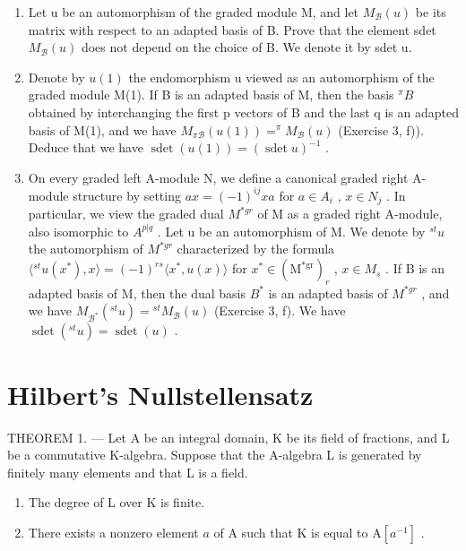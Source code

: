 \begin{enumerate}
\def\labelenumi{\alph{enumi})}
\item
  Let u be an automorphism of the graded module M, and let \(M_{\mathcal{B}}(u)\) be its matrix with respect to an adapted basis of B. Prove that the element sdet \(M_{\mathcal{B}}(u)\) does not depend on the choice of B. We denote it by sdet u.
\item
  Denote by \(u(1)\) the endomorphism u viewed as an automorphism of the graded module M(1). If B is an adapted basis of M, then the basis \(^{\pi}B\) obtained by interchanging the first p vectors of B and the last q is an adapted basis of M(1), and we have \(M_{\pi\mathcal{B}}(u(1)) = ^{\pi}M_{\mathcal{B}}(u)\) (Exercise 3, f)). Deduce that we have \(\operatorname{sdet}(u(1)) = (\operatorname{sdet} u)^{-1}\) .
\item
  On every graded left A-module N, we define a canonical graded right A-module structure by setting \(ax = (-1)^{ij}xa\) for \(a \in A_i\) , \(x \in N_j\) . In particular, we view the graded dual \(M^{*gr}\) of M as a graded right A-module, also isomorphic to \(A^{p|q}\) . Let u be an automorphism of M. We denote by \({}^{st}u\) the automorphism of \(M^{*gr}\) characterized by the formula \(\langle{}^{st}u(x^{*}), x\rangle = (-1)^{rs}\langle x^{*}, u(x)\rangle\) for \(x^{*} \in (\mathrm{M}^{*\mathrm{gr}})_r\) , \(x \in M_s\) . If B is an adapted basis of M, then the dual basis \(B^*\) is an adapted basis of \(M^{*gr}\) , and we have \(M_{\mathcal{B}^*}({}^{st}u) = {}^{st}M_{\mathcal{B}}(u)\) (Exercise 3, f). We have \(\operatorname{sdet}({}^{st}u) = \operatorname{sdet}(u)\) .
\end{enumerate}

\chapter{Hilbert's Nullstellensatz}

THEOREM 1. --- Let A be an integral domain, K be its field of fractions, and L be a commutative K-algebra. Suppose that the A-algebra L is generated by finitely many elements and that L is a field.

\begin{enumerate}
\def\labelenumi{\alph{enumi})}
\item
  The degree of L over K is finite.
\item
  There exists a nonzero element \(a\) of \(\mathrm{A}\) such that \(\mathrm{K}\) is equal to \(\mathrm{A}[a^{-1}]\) .
\end{enumerate}

